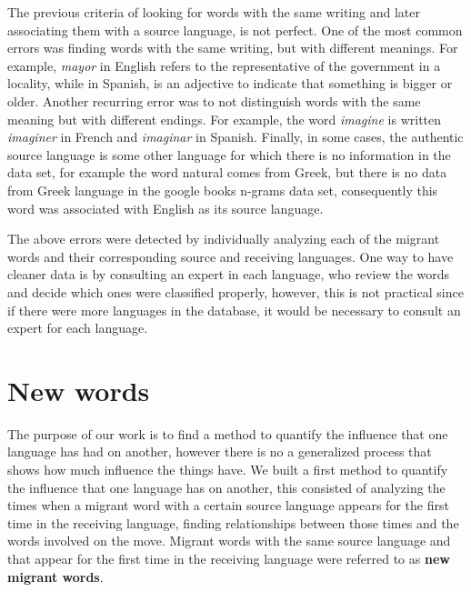 \documentclass[10pt,letterpaper]{article} %
\begin{document}
The previous criteria of looking for words with the same writing and later
associating them with a source language, is not perfect. One of the most common
errors was finding words with the same writing, but with different meanings.
For example,  \textit{mayor} in English refers to the representative of the government in
a locality, while in Spanish,  is an adjective to indicate that something
is bigger or older.  Another recurring error was to not distinguish words with
the same meaning but with different endings. For example, the word \textit{imagine} is
written \textit{imaginer} in French and \textit{imaginar} in Spanish.  Finally, in some cases, the
authentic source language is some other language for which there is no
information in the data set, for example the word  natural comes from Greek,
but there is no data from Greek language in the google books n-grams data set,
consequently this word was associated with English as its source language.

The above errors were detected by individually analyzing each of the migrant
words and their corresponding source and receiving languages. One way to have
cleaner data is by consulting an expert in each language, who review the words
and decide which ones were classified properly, however, this is not practical
since if there were more languages in the database, it would be
necessary to consult an expert for each language.

\section*{New words} %
The purpose of our work is to find a method to quantify the influence that one
language has had on another, however there is no a generalized process that
shows how much influence the things have. We built a first method to quantify
the influence that one language has on another, this consisted of analyzing the
times when a migrant word with a certain source language appears for the first
time in the receiving language, finding relationships between those times and
the words involved on the move. Migrant words with the same source language and
that appear for the first time in the receiving language were referred to as
\textbf{new migrant words}. 
\end{document}
